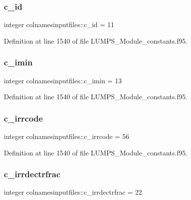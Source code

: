 \subsubsection{\texorpdfstring{c\+\_\+id}{c\_id}}
{\footnotesize\ttfamily integer colnamesinputfiles\+::c\+\_\+id = 11}



Definition at line 1540 of file L\+U\+M\+P\+S\+\_\+\+Module\+\_\+constants.\+f95.

\mbox{\label{namespacecolnamesinputfiles_af4f7bc5a0ee3a5b751aac8da4bd0dbd2}} 
\subsubsection{\texorpdfstring{c\+\_\+imin}{c\_imin}}
{\footnotesize\ttfamily integer colnamesinputfiles\+::c\+\_\+imin = 13}



Definition at line 1540 of file L\+U\+M\+P\+S\+\_\+\+Module\+\_\+constants.\+f95.

\mbox{\label{namespacecolnamesinputfiles_a334ff4db36344c4e3aebd61f59639481}} 
\subsubsection{\texorpdfstring{c\+\_\+irrcode}{c\_irrcode}}
{\footnotesize\ttfamily integer colnamesinputfiles\+::c\+\_\+irrcode = 56}



Definition at line 1540 of file L\+U\+M\+P\+S\+\_\+\+Module\+\_\+constants.\+f95.

\mbox{\label{namespacecolnamesinputfiles_a9ed1b8e9314a06c21406c39846ac6b62}} 
\subsubsection{\texorpdfstring{c\+\_\+irrdectrfrac}{c\_irrdectrfrac}}
{\footnotesize\ttfamily integer colnamesinputfiles\+::c\+\_\+irrdectrfrac = 22}



